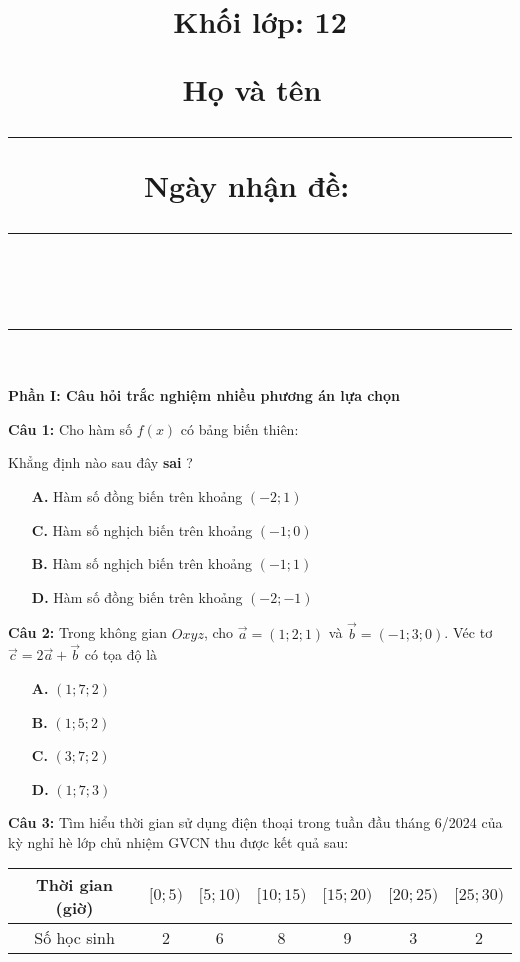 \documentclass[12pt, a4paper]{article}
\title{\vspace{-1.5cm}{\huge\textbf{Ôn thi cuối kỳ I - Lần 2}}\\[3mm]
		{\LARGE Khối lớp: 12}\\[2mm]
{\normalsize Họ và tên~\rule{3cm}{1pt} \hfill Ngày nhận đề: ~\rule{3cm}{1pt}}\\[4mm]
\hrule
}
\author{}
\date{}
\begin{document}
	\maketitle
	\vspace{-2.15cm}
	
\textbf{Phần I: Câu hỏi trắc nghiệm nhiều phương án lựa chọn} 

\textbf{Câu 1: } Cho hàm số $ f(x) $ có bảng biến thiên:
	\begin{center}
	\end{center}	
	Khẳng định nào sau đây \textbf{sai} ?
	\begin{multicols}{2}
		\begin{enumerate}
			\item[\textbf{A.}] Hàm số đồng biến trên khoảng $ (-2; 1) $
			\item[\textbf{C.}] Hàm số nghịch biến trên khoảng $ (-1; 0 )$
			\item[\textbf{B.}] Hàm số nghịch biến trên khoảng $ (-1; 1) $
			\item[\textbf{D.}] Hàm số đồng biến trên khoảng $ (-2; -1) $
		\end{enumerate}
	\end{multicols}
	

\textbf{Câu 2: } Trong không gian $ Oxyz $, cho $ \vec{a} = (1;2;1) $ và $ \vec{b} = (-1;3;0) $. Véc tơ $ \overrightarrow{c} = 2\vec{a} + \vec{b} $ có tọa độ là
	\begin{multicols}{4}
		\begin{enumerate}
			\item[\textbf{A.}] $ (1; 7; 2) $
			\item[\textbf{B.}] $ (1; 5; 2) $
			\item[\textbf{C.}] $ (3; 7; 2) $
			\item[\textbf{D.}] $ (1; 7; 3) $
		\end{enumerate}
	\end{multicols}

\textbf{Câu 3: } Tìm hiểu thời gian sử dụng điện thoại trong tuần đầu tháng 6/2024 của kỳ nghỉ hè lớp chủ nhiệm GVCN thu được kết quả sau:
	\begin{table}[h!]
		\centering
		\renewcommand{\arraystretch}{1.5}
			\begin{tabular}{|c||c|c|c|c|c|c|}
				\hline
				Thời gian (giờ) & $ [0;5) $ & $ [5; 10) $ & $ [10; 15) $ & $ [15; 20) $ & $ [20; 25) $ & $ [25; 30) $ \\ \hline
				Số học sinh  & 2 & 6  & 8 & 9 & 3 & 2    \\ \hline 
			\end{tabular}
	\end{table}
	
\end{document}
